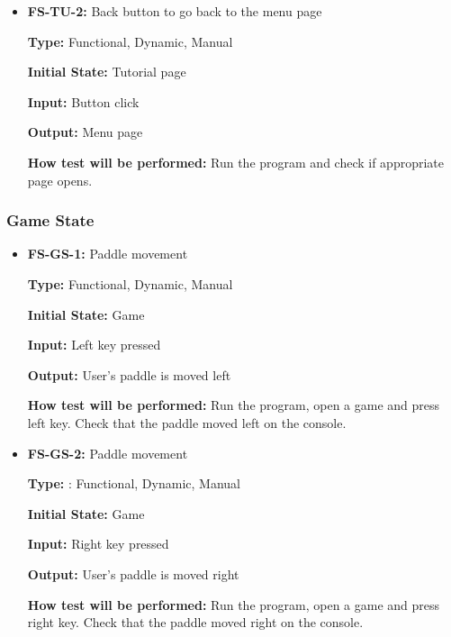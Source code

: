 \documentclass[12pt,letterpaper]{article}
\begin{document}
\begin{reqbox}
	\begin{itemize}
	\item \textbf{FS-TU-2: }Back button to go back to the menu page

	\textbf{Type: }Functional, Dynamic, Manual

	\textbf{Initial State: }Tutorial page	

	\textbf{Input: }Button click

	\textbf{Output: }Menu page

	\textbf{How test will be performed: }Run the program and check if appropriate page opens.
	\end{itemize}
\end{reqbox}

	\subsubsection{Game State}
\begin{reqbox}
	\begin{itemize}
	\item \textbf{FS-GS-1: }Paddle movement

	\textbf{Type: }Functional, Dynamic, Manual

	\textbf{Initial State: }Game 

	\textbf{Input: }Left key pressed

	\textbf{Output: }User’s paddle is moved left

	\textbf{How test will be performed: }Run the program, open a game and press left key. Check that the paddle moved left on the console.
	\end{itemize}
\end{reqbox}

\begin{reqbox}
	\begin{itemize}
	\item \textbf{FS-GS-2: }Paddle movement

	\textbf{Type: }: Functional, Dynamic, Manual

	\textbf{Initial State: } Game 

	\textbf{Input: } Right key pressed

	\textbf{Output: }User’s paddle is moved right

	\textbf{How test will be performed: }Run the program, open a game and press right key. Check that the paddle moved right on the console.
	\end{itemize}
\end{reqbox}
\end{document}

